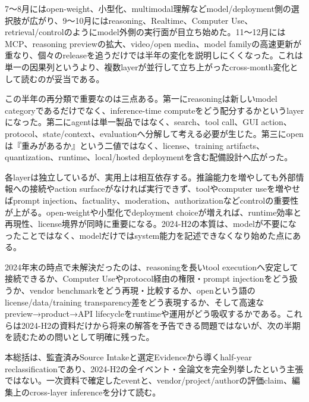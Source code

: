 
7〜8月にはopen-weight、小型化、multimodal理解などmodel/deployment側の選択肢が広がり、9〜10月にはreasoning、Realtime、Computer Use、retrieval/controlのようにmodel外側の実行面が目立ち始めた。11〜12月にはMCP、reasoning previewの拡大、video/open media、model familyの高速更新が重なり、個々のreleaseを追うだけでは半年の変化を説明しにくくなった。これは単一の因果列というより、複数layerが並行して立ち上がったcross-month変化として読むのが妥当である。\autocite{src-bcbc025369e3,src-ee43656ed6da}


この半年の再分類で重要なのは三点ある。第一にreasoningは新しいmodel categoryであるだけでなく、inference-time computeをどう配分するかというlayerになった。第二にagentは単一製品ではなく、search、tool call、GUI action、protocol、state/context、evaluationへ分解して考える必要が生じた。第三にopenは『重みがあるか』という二値ではなく、license、training artifacts、quantization、runtime、local/hosted deploymentを含む配備設計へ広がった。\autocite{src-9cf289b414fd,src-ee43656ed6da}


各layerは独立しているが、実用上は相互依存する。推論能力を増やしても外部情報への接続やaction surfaceがなければ実行できず、toolやcomputer useを増やせばprompt injection、factuality、moderation、authorizationなどcontrolの重要性が上がる。open-weightや小型化でdeployment choiceが増えれば、runtime効率と再現性、license境界が同時に重要になる。2024-H2の本質は、modelが不要になったことではなく、modelだけではsystem能力を記述できなくなり始めた点にある。\autocite{src-3278a129a17e,src-9cf289b414fd}


2024年末の時点で未解決だったのは、reasoningを長いtool executionへ安定して接続できるか、Computer Useやprotocol経由の権限・prompt injectionをどう扱うか、vendor benchmarkをどう再現・比較するか、openという語のlicense/data/training transparency差をどう表現するか、そして高速なpreview→product→API lifecycleをruntimeや運用がどう吸収するかである。これらは2024-H2の資料だけから将来の解答を予告できる問題ではないが、次の半期を読むための問いとして明確に残った。\autocite{src-3278a129a17e,src-bcbc025369e3}


\begin{claimboundary}
本総括は、監査済みSource Intakeと選定Evidenceから導くhalf-year reclassificationであり、2024-H2の全イベント・全論文を完全列挙したという主張ではない。一次資料で確定したeventと、vendor/project/authorの評価claim、編集上のcross-layer inferenceを分けて読む。\autocite{src-bcbc025369e3}
\end{claimboundary}
